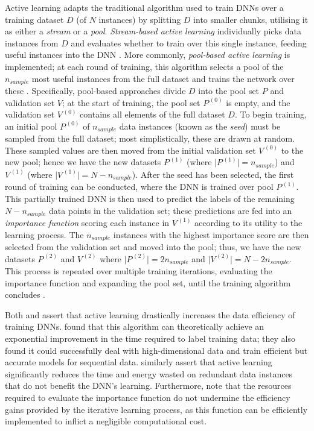 \documentclass[a4paper, 11pt]{report}
\begin{document}
    Active learning adapts the traditional algorithm used to train DNNs over a training dataset $D$ (of $N$ instances) by splitting $D$ into smaller chunks, utilising it as either a \emph{stream} or a \emph{pool}. \emph{Stream-based active learning} individually picks data instances from $D$ and evaluates whether to train over this single instance, feeding useful instances into the DNN \citep{ren-2021}. More commonly, \emph{pool-based active learning} is implemented; at each round of training, this algorithm selects a pool of the $n_{sample}$ most useful instances from the full dataset and trains the network over these \citep{ren-2021}. Specifically, pool-based approaches divide $D$ into the pool set $P$ and validation set $V$; at the start of training, the pool set $P^{\,(0)}$ is empty, and the validation set $V^{\,(0)}$ contains all elements of the full dataset $D$. To begin training, an initial pool $P^{\,(0)}$ of $n_{sample}$ data instances (known as the \emph{seed}) must be sampled from the full dataset; most simplistically, these are drawn at random. These sampled values are then moved from the initial validation set $V^{\,(0)}$ to the new pool; hence we have the new datasets $P^{\,(1)}$ (where $\big\vert P^{\,(1)} \big\vert = n_{sample}$) and $V^{\,(1)}$ (where $\big\vert V^{\,(1)} \big\vert = N - n_{sample}$). After the seed has been selected, the first round of training can be conducted, where the DNN is trained over pool $P^{\,(1)}$. This partially trained DNN is then used to predict the labels of the remaining $N - n_{sample}$ data points in the validation set; these predictions are fed into an \emph{importance function} scoring each instance in $V^{\,(1)}$ according to its utility to the learning process. The $n_{sample}$ instances with the highest importance score are then selected from the validation set and moved into the pool; thus, we have the new datasets $P^{\,(2)}$ and $V^{\,(2)}$ where $\big\vert P^{\,(2)} \big\vert = 2 n_{sample}$ and $\big\vert V^{\,(2)} \big\vert = N - 2 n_{sample}$. This process is repeated over multiple training iterations, evaluating the importance function and expanding the pool set, until the training algorithm concludes \citep{ren-2021}.

    Both \citet{ren-2021} and \citet{xu-2021} assert that active learning drastically increases the data efficiency of training DNNs. \citet{ren-2021} found that this algorithm can theoretically achieve an exponential improvement in the time required to label training data; they also found it could successfully deal with high-dimensional data and train efficient but accurate models for sequential data. \citet{xu-2021} similarly assert that active learning significantly reduces the time and energy wasted on redundant data instances that do not benefit the DNN's learning. Furthermore, \citet{ren-2021} note that the resources required to evaluate the importance function do not undermine the efficiency gains provided by the iterative learning process, as this function can be efficiently implemented to inflict a negligible computational cost. 
\end{document}

